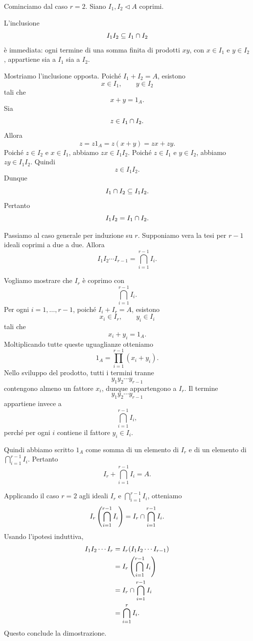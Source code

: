 \documentclass[a4paper]{article}
\begin{document}
\begin{radioactive}
\begin{snippetproof}{}
    Cominciamo dal caso \(r=2\). Siano \(I_1,I_2\triangleleft A\) coprimi.

    L'inclusione
    \[
        I_1I_2\subseteq I_1\cap I_2
    \]
    è immediata: ogni termine di una somma finita di prodotti \(xy\), con \(x\in I_1\) e \(y\in I_2\), appartiene sia a \(I_1\) sia a \(I_2\).

    Mostriamo l'inclusione opposta. Poiché \(I_1+I_2=A\), esistono
    \[
        x\in I_1,
        \qquad
        y\in I_2
    \]
    tali che
    \[
        x+y=1_A.
    \]
    Sia
    \[
        z\in I_1\cap I_2.
    \]
    Allora
    \[
        z=z1_A=z(x+y)=zx+zy.
    \]
    Poiché \(z\in I_2\) e \(x\in I_1\), abbiamo \(zx\in I_1I_2\).
    Poiché \(z\in I_1\) e \(y\in I_2\), abbiamo \(zy\in I_1I_2\).
    Quindi
    \[
        z\in I_1I_2.
    \]
    Dunque
    \[
        I_1\cap I_2\subseteq I_1I_2.
    \]
    Pertanto
    \[
        I_1I_2=I_1\cap I_2.
    \]

    Passiamo al caso generale per induzione su \(r\).
    Supponiamo vera la tesi per \(r-1\) ideali coprimi a due a due. Allora
    \[
        I_1I_2\cdots I_{r-1}
        =
        \bigcap_{i=1}^{r-1} I_i.
    \]

    Vogliamo mostrare che \(I_r\) è coprimo con
    \[
        \bigcap_{i=1}^{r-1} I_i.
    \]
    Per ogni \(i=1,\ldots,r-1\), poiché \(I_i+I_r=A\), esistono
    \[
        x_i\in I_r,
        \qquad
        y_i\in I_i
    \]
    tali che
    \[
        x_i+y_i=1_A.
    \]
    Moltiplicando tutte queste uguaglianze otteniamo
    \[
        1_A
        =
        \prod_{i=1}^{r-1}(x_i+y_i).
    \]
    Nello sviluppo del prodotto, tutti i termini tranne
    \[
        y_1y_2\cdots y_{r-1}
    \]
    contengono almeno un fattore \(x_i\), dunque appartengono a \(I_r\).
    Il termine
    \[
        y_1y_2\cdots y_{r-1}
    \]
    appartiene invece a
    \[
        \bigcap_{i=1}^{r-1} I_i,
    \]
    perché per ogni \(i\) contiene il fattore \(y_i\in I_i\).

    Quindi abbiamo scritto \(1_A\) come somma di un elemento di \(I_r\) e di un elemento di \(\bigcap_{i=1}^{r-1} I_i\). Pertanto
    \[
        I_r+\bigcap_{i=1}^{r-1} I_i=A.
    \]

    Applicando il caso \(r=2\) agli ideali \(I_r\) e \(\bigcap_{i=1}^{r-1} I_i\), otteniamo
    \[
        I_r\left(\bigcap_{i=1}^{r-1} I_i\right)
        =
        I_r\cap \bigcap_{i=1}^{r-1} I_i.
    \]
    Usando l'ipotesi induttiva,
    \begin{align*}
        I_1I_2\cdots I_r
        &=
        I_r(I_1I_2\cdots I_{r-1}) \\
        &=
        I_r\left(\bigcap_{i=1}^{r-1} I_i\right) \\
        &=
        I_r\cap \bigcap_{i=1}^{r-1} I_i \\
        &=
        \bigcap_{i=1}^r I_i.
    \end{align*}
    Questo conclude la dimostrazione.
\end{snippetproof}
\end{radioactive}
\end{document}
